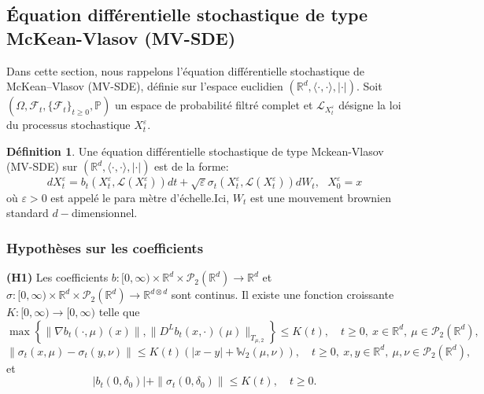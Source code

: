 \documentclass[12pt,a4paper,twoside]{book}%
\theoremstyle{definition}
\newtheorem{dfn}{Définition}[section]
\numberwithin{equation}{section}
\begin{document}
\subsection{Équation différentielle stochastique de type McKean-Vlasov (MV-SDE)}
Dans cette section, nous rappelons l’équation différentielle stochastique de McKean–Vlasov (MV-SDE), définie sur l’espace euclidien $(\mathbb{R}^d, \langle \cdot, \cdot \rangle ,|\cdot|)$. 
Soit $(\Omega,\mathcal{F}_t,\{\mathcal{F}_t\}_{t\geqslant 0},\mathbb{P})$ un espace de probabilité filtré complet et $\mathcal{L}_{X^\varepsilon_t}$ désigne la loi du processus stochastique $X^\varepsilon_t$.
\begin{dfn}
	Une équation différentielle stochastique de type Mckean-Vlasov (MV-SDE) sur $(\mathbb{R}^d, \langle \cdot, \cdot \rangle ,|\cdot|)$ est de la forme:
	\begin{equation}
		dX_t^\varepsilon = b_t(X_t^\varepsilon,\mathcal{L}(X_t^\varepsilon))dt +\sqrt{\varepsilon}\sigma_t(X_t^\varepsilon,\mathcal{L}(X_t^\varepsilon))dW_t,\text{    } X_0^\varepsilon=x
	\end{equation}
	où $\varepsilon > 0$ est appelé le para
	mètre d'échelle.Ici, $W_t$ est une mouvement brownien standard $d-$dimensionnel.
\end{dfn}
\subsubsection{Hypothèses sur les coefficients}
\textbf{(H1)} Les coefficients $b : [0, \infty) \times \mathbb{R}^d \times \mathcal{P}_2(\mathbb{R}^d) \to \mathbb{R}^d$ et $\sigma : [0, \infty) \times \mathbb{R}^d \times \mathcal{P}_2(\mathbb{R}^d) \to \mathbb{R}^{d \otimes d}$ sont continus. Il existe une fonction croissante $K : [0, \infty) \to [0, \infty)$ telle que
\begin{equation}
	\max\left\{ \|\nabla b_t(\cdot, \mu)(x)\|, \| D^L b_t(x, \cdot)(\mu) \|_{T_{\mu,2}} \right\} \leq K(t), \quad t \geq 0,\ x \in \mathbb{R}^d,\ \mu \in \mathcal{P}_2(\mathbb{R}^d),
\end{equation}
\begin{equation}
	\|\sigma_t(x, \mu) - \sigma_t(y, \nu)\| \leq K(t)(|x - y| + \mathbb{W}_2(\mu, \nu)), \quad t \geq 0,\ x, y \in \mathbb{R}^d,\ \mu, \nu \in \mathcal{P}_2(\mathbb{R}^d),
\end{equation}
et
\begin{equation}
	|b_t(0, \delta_0)| + \|\sigma_t(0, \delta_0)\| \leq K(t), \quad t \geq 0.
\end{equation}
\end{document}
